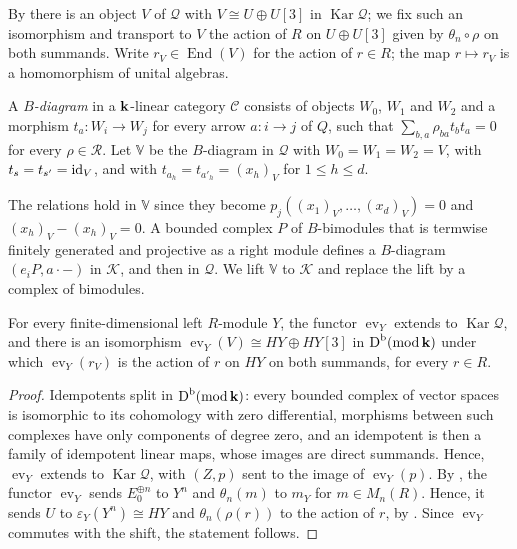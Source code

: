 By  there is an object $V$ of $\mathcal{Q}$ with
${V\cong U\oplus U[3]}$ in $\operatorname{Kar}\mathcal{Q}$; we fix such an
isomorphism and transport to $V$ the action of $R$ on ${U\oplus U[3]}$ given by
${\theta_n\circ\rho}$ on both summands. Write ${r_V\in\operatorname{End}(V)}$ for
the action of ${r\in R}$; the map ${r\mapsto r_V}$ is a homomorphism of unital
algebras.

\begin{construction}
  \label{cons:diagram-V}
  A \emph{$B$-diagram} in a $\mathbf{k}$-linear category $\mathcal{C}$ consists of
  objects $W_0$, $W_1$ and $W_2$ and a morphism ${t_a\colon W_i\to W_j}$ for
  every arrow ${a\colon i\to j}$ of $Q$, such that
  ${\sum_{b,a}\rho_{ba}t_bt_a=0}$ for every ${\rho\in\mathcal{R}}$. Let $\mathbb{V}$
  be the $B$-diagram in $\mathcal{Q}$
  with ${W_0=W_1=W_2=V}$, with ${t_s=t_{s'}=\id[V]}$, and with
  ${t_{a_h}=t_{a'_h}=(x_h)_V}$ for ${1\leq h\leq d}$.
\end{construction}

The relations hold in $\mathbb{V}$ since they become ${p_j((x_1)_V,\dots,
(x_d)_V)}={0}$ and ${(x_h)_V-(x_h)_V=0}$. A bounded complex $P$ of $B$-bimodules that
is termwise finitely generated and projective as a right module defines a
$B$-diagram ${(e_iP,a\cdot-)}$ in $\mathcal{K}$, and then in $\mathcal{Q}$. We
lift $\mathbb{V}$ to $\mathcal{K}$ and replace the lift by a complex of
bimodules.

\begin{lemma}
  \label{lemma:evaluate-V}
  For every finite-dimensional left $R$-module $Y$, the functor
  $\operatorname{ev}_Y$ extends to $\operatorname{Kar}\mathcal{Q}$, and there
  is an isomorphism ${\operatorname{ev}_Y(V)\cong HY\oplus HY[3]}$ in
  $\DerCat[b]{\operatorname{mod}\kk}$ under which $\operatorname{ev}_Y(r_V)$ is
  the action of $r$ on $HY$ on both summands, for every ${r\in R}$.
\end{lemma}

\begin{proof}
  Idempotents split in $\DerCat[b]{\operatorname{mod}\kk}$: every bounded
  complex of vector spaces is isomorphic to its cohomology with zero
  differential, morphisms between such complexes have only components of
  degree zero, and an idempotent is then a family of idempotent linear maps,
  whose images are direct summands. Hence, $\operatorname{ev}_Y$ extends to
  $\operatorname{Kar}\mathcal{Q}$, with $(Z,p)$ sent to the image of
  $\operatorname{ev}_Y(p)$. By , the functor
  $\operatorname{ev}_Y$ sends $E_0^{\oplus n}$ to $Y^n$ and $\theta_n(m)$ to
  $m_Y$ for ${m\in M_n(R)}$. Hence, it sends $U$ to ${\varepsilon_Y(Y^n)\cong HY}$
  and $\theta_n(\rho(r))$ to the action of $r$, by
  . Since $\operatorname{ev}_Y$ commutes with the
  shift, the statement follows.
\end{proof}

